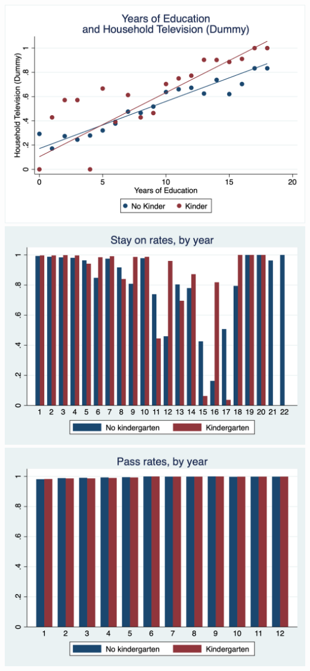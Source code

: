 \documentclass[6pt]{article}
\begin{document}
\includegraphics[width=\textwidth]{television_educ14.png}
\includegraphics[width=\textwidth]{stayon_sample.png}
\includegraphics[width=\textwidth]{pass_sample.png}
\end{document}
